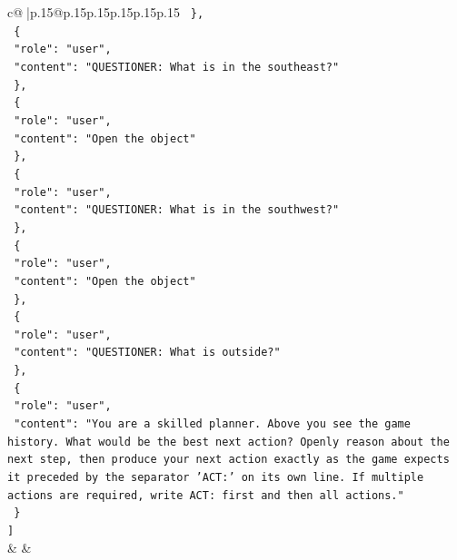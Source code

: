 \documentclass{article}
\begin{document}
{\begin{supertabular}{c@{$\;$}|p{.15\linewidth}@{}p{.15\linewidth}p{.15\linewidth}p{.15\linewidth}p{.15\linewidth}p{.15\linewidth}}
{{{\texttt{  \},} \\
\texttt{  \{} \\
\texttt{    "role": "user",} \\
\texttt{    "content": "QUESTIONER: What is in the southeast?"} \\
\texttt{  \},} \\
\texttt{  \{} \\
\texttt{    "role": "user",} \\
\texttt{    "content": "Open the object"} \\
\texttt{  \},} \\
\texttt{  \{} \\
\texttt{    "role": "user",} \\
\texttt{    "content": "QUESTIONER: What is in the southwest?"} \\
\texttt{  \},} \\
\texttt{  \{} \\
\texttt{    "role": "user",} \\
\texttt{    "content": "Open the object"} \\
\texttt{  \},} \\
\texttt{  \{} \\
\texttt{    "role": "user",} \\
\texttt{    "content": "QUESTIONER: What is outside?"} \\
\texttt{  \},} \\
\texttt{  \{} \\
\texttt{    "role": "user",} \\
\texttt{    "content": "You are a skilled planner. Above you see the game history. What would be the best next action? Openly reason about the next step, then produce your next action exactly as the game expects it preceded by the separator 'ACT:' on its own line. If multiple actions are required, write ACT: first and then all actions."} \\
\texttt{  \}} \\
\texttt{{]}} \\
            }
        }
    }
    & & \\ \\


\end{supertabular}}
\end{document}
